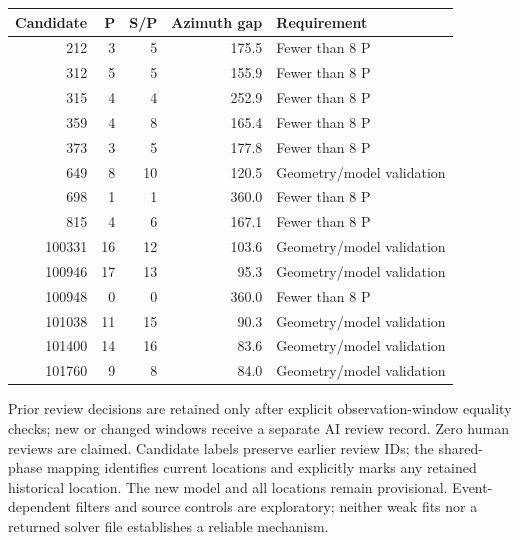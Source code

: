 \begin{center}\small\begin{tabular}{rrrrl}\toprule Candidate & P & S/P & Azimuth gap & Requirement\\\midrule

212 & 3 & 5 & 175.5 & Fewer than 8 P\\

312 & 5 & 5 & 155.9 & Fewer than 8 P\\

315 & 4 & 4 & 252.9 & Fewer than 8 P\\

359 & 4 & 8 & 165.4 & Fewer than 8 P\\

373 & 3 & 5 & 177.8 & Fewer than 8 P\\

649 & 8 & 10 & 120.5 & Geometry/model validation\\

698 & 1 & 1 & 360.0 & Fewer than 8 P\\

815 & 4 & 6 & 167.1 & Fewer than 8 P\\

100331 & 16 & 12 & 103.6 & Geometry/model validation\\

100946 & 17 & 13 & 95.3 & Geometry/model validation\\

100948 & 0 & 0 & 360.0 & Fewer than 8 P\\

101038 & 11 & 15 & 90.3 & Geometry/model validation\\

101400 & 14 & 16 & 83.6 & Geometry/model validation\\

101760 & 9 & 8 & 84.0 & Geometry/model validation\\

\bottomrule\end{tabular}\end{center}

\par{}\par{}\par{}\par{}

Prior review decisions are retained only after explicit observation-window equality checks; new or changed windows receive a separate AI review record. Zero human reviews are claimed. Candidate labels preserve earlier review IDs; the shared-phase mapping identifies current locations and explicitly marks any retained historical location. The new model and all locations remain provisional. Event-dependent filters and source controls are exploratory; neither weak fits nor a returned solver file establishes a reliable mechanism.

